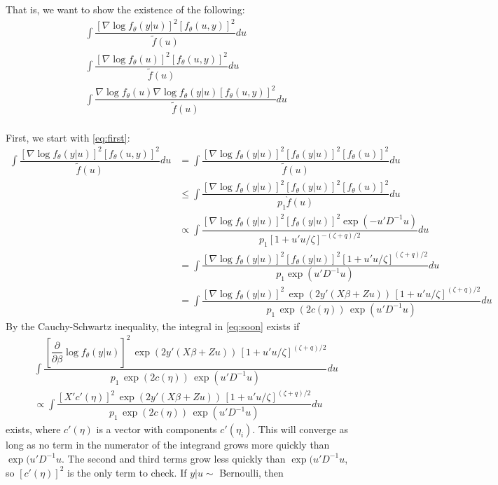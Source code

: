\documentclass{article}
\begin{document}
That is, we want to show the existence of the following:
\begin{align}
&\int \dfrac{ \left[ \nabla \log f_\theta (y|u) \right]^2 \left[ f_\theta(u,y)\right]^2}{\tilde{f}(u)} du \label{eq:first} \\
&\int \dfrac{ \left[ \nabla \log f_\theta (u) \right]^2 \left[ f_\theta(u,y)\right]^2}{\tilde{f}(u)} du \label{eq:second} \\
&\int \dfrac{  \nabla \log f_\theta (u)  \nabla \log f_\theta (y|u)  \left[ f_\theta(u,y)\right]^2}{\tilde{f}(u)} du \\
\end{align}

First, we start with \eqref{eq:first}:
\begin{align}
\int \dfrac{ \left[ \nabla \log f_\theta (y|u) \right]^2 \left[ f_\theta(u,y)\right]^2}{\tilde{f}(u)} du 
&=\int \dfrac{ \left[ \nabla \log f_\theta (y|u) \right]^2 \left[ f_\theta(y|u)\right]^2 \left[ f_\theta(u)\right]^2}{\tilde{f}(u)} du \\
&\leq \int \dfrac{ \left[ \nabla \log f_\theta (y|u) \right]^2 \left[ f_\theta(y|u)\right]^2 \left[ f_\theta(u)\right]^2}{p_1\grave{f}(u)} du \\
&\propto \int \dfrac{ \left[ \nabla \log f_\theta (y|u) \right]^2 \left[ f_\theta(y|u)\right]^2 \exp(-u'D^{-1}u)}{p_1\left[ 1+u'u/\zeta  \right]^{-(\zeta+q)/2}} du \\
&= \int \dfrac{ \left[ \nabla \log f_\theta (y|u) \right]^2 \left[ f_\theta(y|u)\right]^2 \left[ 1+u'u/\zeta  \right]^{(\zeta+q)/2} }{p_1 \exp(u'D^{-1}u)} du \\
&= \int \dfrac{ \left[ \nabla \log f_\theta (y|u) \right]^2 \, \exp(2y'(X \beta+Zu)) \,  \left[ 1+u'u/\zeta  \right]^{(\zeta+q)/2} }{ p_1 \, \exp(2 c(\eta)) \,\exp(u'D^{-1}u)} du \label{eq:soon}
\end{align}
By the Cauchy-Schwartz inequality, the integral in \eqref{eq:soon} exists if
\begin{align}
 & \int \dfrac{ \left[\dfrac{\partial}{\partial \beta} \log f_\theta (y|u) \right]^2 \, \exp(2y'(X \beta+Zu)) \,  \left[ 1+u'u/\zeta  \right]^{(\zeta+q)/2} }{ p_1 \, \exp(2 c(\eta)) \,\exp(u'D^{-1}u)} du \nonumber \\
&\propto  \int \dfrac{ \left[X' c'(\eta) \right]^2 \, \exp(2y'(X \beta+Zu)) \,  \left[ 1+u'u/\zeta  \right]^{(\zeta+q)/2} }{ p_1 \, \exp(2 c(\eta)) \,\exp(u'D^{-1}u)} du \label{eq:soon2}
\end{align}
exists, where $c'(\eta)$ is a vector with components $c'(\eta_i)$.  This will converge as long as no term in the numerator of the integrand grows more quickly than $\exp(u'D^{-1}u$. The second and third terms grow less quickly than $\exp(u'D^{-1}u$, so $\left[ c'(\eta)\right]^2$ is the only term to check.  If $y|u \sim$ Bernoulli, then 
\end{document}
